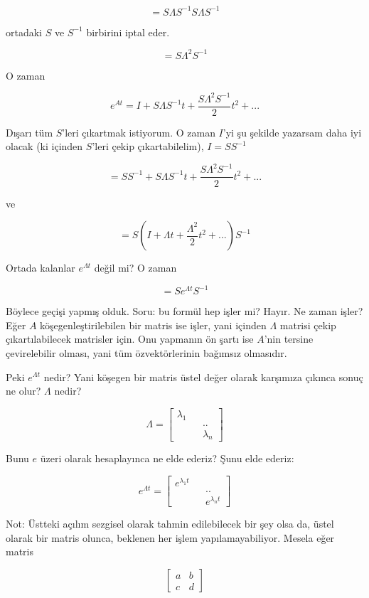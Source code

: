 \documentclass[12pt,fleqn]{article}\usepackage{../../common}
\begin{document}
$$ = S \Lambda S^{-1}S \Lambda S^{-1} $$

ortadaki $S$ ve $S^{-1}$ birbirini iptal eder. 

$$ = S \Lambda^2 S^{-1} $$

O zaman 

$$ e^{At} = I + S \Lambda S^{-1} t + \frac{S \Lambda^2 S^{-1}}{2}t^2 + ...$$

Dışarı tüm $S$'leri çıkartmak istiyorum. O zaman $I$'yi şu şekilde yazarsam
daha iyi olacak (ki içinden $S$'leri çekip çıkartabilelim), $I = SS^{-1}$

$$ = SS^{-1} + S \Lambda S^{-1} t + \frac{S \Lambda^2 S^{-1}}{2}t^2 + ...$$

ve

$$ = S (I + \Lambda t + \frac{\Lambda^2}{2}t^2 + ...) S^{-1}$$

Ortada kalanlar $e^{\Lambda t}$ değil mi? O zaman

$$ = S e^{\Lambda t}S^{-1} $$

Böylece geçişi yapmış olduk. Soru: bu formül hep işler mi? Hayır. Ne zaman
işler? Eğer $A$ köşegenleştirilebilen bir matris ise işler, yani içinden
$\Lambda$ matrisi çekip çıkartılabilecek matrisler için. Onu yapmanın ön
şartı ise $A$'nin tersine çevirelebilir olması, yani tüm özvektörlerinin
bağımsız olmasıdır.

Peki $e^{\Lambda t}$ nedir? Yani köşegen bir matris üstel değer olarak
karşımıza çıkınca sonuç ne olur? $\Lambda$ nedir?

$$ \Lambda =
\left[\begin{array}{ccc}
\lambda_1 && \\
&&.. \\
&& \lambda_n
\end{array}\right]
 $$

Bunu $e$ üzeri olarak hesaplayınca ne elde ederiz? Şunu elde ederiz:

$$ e^{\Lambda t} =
\left[\begin{array}{ccc}
e^{\lambda_1t} && \\
&&.. \\
&& e^{\lambda_n t}
\end{array}\right]
 $$

Not: Üstteki açılım sezgisel olarak tahmin edilebilecek bir şey olsa da,
üstel olarak bir matris olunca, beklenen her işlem yapılamayabiliyor. Mesela 
eğer matris

$$ 
\left[\begin{array}{cc}
a & b \\ c & d
\end{array}\right]
 $$
\end{document}
